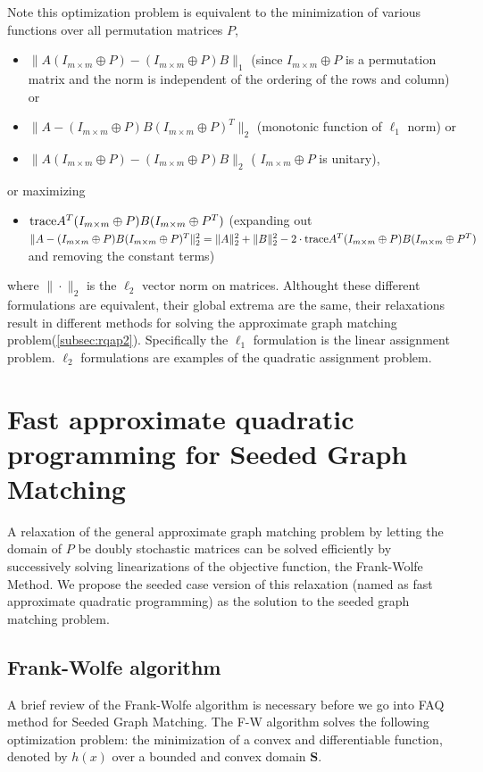 \documentclass[12pt,oneside,final]{thesis}\usepackage[]{graphicx}\usepackage[]{color}
\begin{document}
   
 Note this optimization problem is equivalent to the minimization of various functions over all permutation matrices $P$,  \eg
 \begin{itemize}
\item $\|A(I_{m \times m}\oplus P)-(I_{m \times m}\oplus P)B\|_1$ (since $I_{m \times m}\oplus P$ is a permutation matrix and the norm is independent of the ordering of the rows and column) or
\item $\|A-(I_{m \times m}\oplus P)B(I_{m \times m}\oplus P)^T\|_2$ (monotonic function of $\ell_1$ norm) or
\item  $\|A(I_{m \times m}\oplus P)-(I_{m \times m}\oplus P)B\|_2$ ( $I_{m \times m}\oplus P$ is unitary), 
 \end{itemize}
or maximizing 
\begin{itemize}
\item $\textup{trace} {A^T(I_{m \times m}\oplus P)B(I_{m \times m}\oplus P^T)}$ (expanding out $\|A-(I_{m \times m}\oplus P)B(I_{m \times m}\oplus P)^T\|_2^2=
\|A\|_2^2 + \|B\|_2^2
- 2 \cdot \textup{trace}{A^T(I_{m \times m}\oplus P)B(I_{m \times m}\oplus P^T)}$  and removing the constant terms) \label{item:squareofdist_eq_tr_crossprod}
\end{itemize}

where $\| \cdot \|_2$ is the $\ell_2$ vector norm on matrices.   Althought these different formulations  are equivalent, \ie  their global extrema are the same, their relaxations result in different methods for solving the approximate graph matching problem(\autoref{subsec:rqap2}). Specifically the $\ell_1$ formulation is the  linear assignment problem. $\ell_2$ formulations are examples of the quadratic assignment problem.

 
\section{Fast approximate quadratic programming for Seeded Graph Matching}


A relaxation of the general   approximate graph matching problem by letting the  domain of $P$ be doubly stochastic matrices can be solved efficiently by successively solving linearizations of the objective function, the Frank-Wolfe Method. We propose the seeded case version of this relaxation (named as fast approximate quadratic programming)  as the solution to the seeded graph matching problem.
\subsection{Frank-Wolfe algorithm}
A brief review of the Frank-Wolfe algorithm is necessary before we go into FAQ method for Seeded Graph Matching. The F-W algorithm solves the following optimization problem: the minimization of a convex and differentiable function, denoted by $h(x)$ 
over a bounded and convex domain $\mathbf{S}$. 
\end{document}
